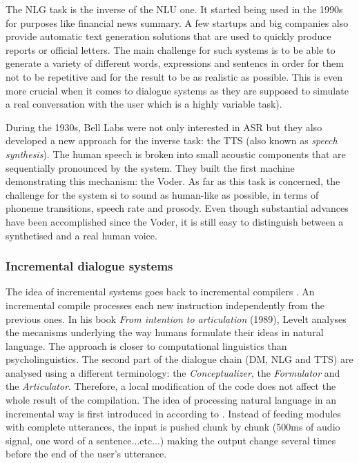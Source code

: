             The NLG task is the inverse of the NLU one. It started being used in the 1990s for purposes like financial news summary. A few startups and big companies also provide automatic text generation solutions that are used to quickly produce reports or official letters. The main challenge for such systems is to be able to generate a variety of different words, expressions and sentencs in order for them not to be repetitive and for the result to be as realistic as possible. This is even more crucial when it comes to dialogue systems as they are supposed to simulate a real conversation with the user which is a highly variable task).

            During the 1930s, Bell Labs were not only interested in ASR but they also developed a new approach for the inverse task: the TTS (also known as \textit{speech synthesis}). The human speech is broken into small acoustic components that are sequentially pronounced by the system. They built the first machine demonstrating this mechanism: the Voder. As far as this task is concerned, the challenge for the system si to sound as human-like as possible, in terms of phoneme transitions, speech rate and prosody. Even though substantial advances have been accomplished since the Voder, it is still easy to distinguish between a synthetised and a real human voice.


        \subsubsection{Incremental dialogue systems}
    
        	The idea of incremental systems goes back to incremental compilers \cite{Lock1965}. An incremental compile processes each new instruction independently from the previous ones. In his book \textit{From intention to articulation} (1989), Levelt analyses the mecanisms underlying the way humans formulate their ideas in natural language. The approach is closer to computational linguistics than psycholinguistics. The second part of the dialogue chain (DM, NLG and TTS) are analysed using a different terminology: the \textit{Conceptualizer}, the \textit{Formulator} and the \textit{Articulator}. Therefore, a local modification of the code does not affect the whole result of the compilation. The idea of processing natural language in an incremental way is first introduced in \cite{Wiren1992} according to \cite{Kilger1995}. Instead of feeding modules with complete utterances, the input is pushed chunk by chunk (500ms of audio signal, one word of a sentence...etc...) making the output change several times before the end of the user's utterance.

